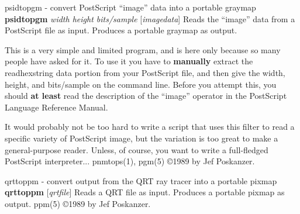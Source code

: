 psidtopgm - convert PostScript ``image'' data into a portable graymap
{\bf psidtopgm}
{\it width height bits/sample}
{\rm [}{\it imagedata}{\rm ]}
Reads the ``image'' data from a PostScript file as input.
Produces a portable graymap as output.
\par
This is a very simple and limited program, and is here only because
so many people have asked for it.
To use it you have to
{\bf manually}
extract the readhexstring data portion from your PostScript file, and then
give the width, height, and bits/sample on the command line.
Before you attempt this, you should
{\bf at least}
read the description of the ``image'' operator in the PostScript Language
Reference Manual.
\par
It would probably not be too hard to write a script that uses this filter
to read a specific variety of PostScript image, but the variation is too
great to make a general-purpose reader.
Unless, of course, you want to write a full-fledged PostScript interpreter...
pnmtops(1), pgm(5)
\copyright 1989 by Jef Poskanzer.
%
 
%

\newpage
%

qrttoppm - convert output from the QRT ray tracer into a portable pixmap
{\bf qrttoppm}
{\rm [}{\it qrtfile}{\rm ]}
Reads a QRT file as input.
Produces a portable pixmap as output.
ppm(5)
\copyright 1989 by Jef Poskanzer.
%
 
